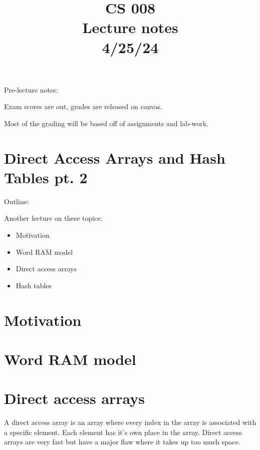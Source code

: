 \documentclass[11pt,a4paper,english]{paper}
\begin{document}
\title{CS 008 \\ Lecture notes \\ 4/25/24}
\maketitle

\begin{gbox}{Pre-lecture notes:} {

Exam scores are out, grades are released on canvas.

Most of the grading will be based off of assignments and lab-work.


}\end{gbox}

\section{Direct Access Arrays and Hash Tables pt. 2}

\begin{bbox}{Outline:}{

Another lecture on these topics:

\begin{itemize}

  \item Motivation
  \item Word RAM model
  \item Direct access arrays
  \item Hash tables

\end{itemize}
} \end{bbox}

\section{Motivation}

\section{Word RAM model}

\section{Direct access arrays}

A direct access array is an array where every index in the array is associated with a specific element. Each element has it's own place in the array. Direct access arrays are very fast but have a major flaw where it takes up too much space.
\end{document}
